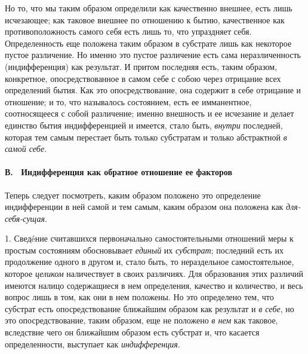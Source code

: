 Но то, что мы таким образом определили как качественно внешнее, есть лишь
исчезающее; как таковое внешнее по отношению к бытию, качественное как
противоположность самого себя есть лишь то, что упраздняет себя.
Определенность еще положена таким образом в субстрате лишь как некоторое
пустое различение. Но именно это пустое различение есть сама
неразличенность (индифференция) как результат. И притом последняя есть,
таким образом, конкретное, опосредствованное в самом себе с собою через
отрицание всех определений бытия. Как это опосредствование, она содержит в
себе отрицание и отношение; и то, что называлось состоянием, есть ее
имманентное, соотносящееся с собой различение; именно внешность и ее
исчезание и делает единство бытия индифференцией и имеется, стало быть,
{\em внутри} последней, которая тем самым перестает
быть только субстратам и только абстрактной {\em в самой себе}.

\paragraph[В. \ Индифференция как обратное отношение ее факторов (70)]{В.
\ Индифференция как обратное отношение ее факторов}
Теперь следует посмотреть, каким
образом положено это определение индифференции в ней самой и тем самым,
каким образом она положена как {\em для-себя-сущая}.

1. Сведéние считавшихся первоначально самостоятельными отношений меры к
простым состояниям обосновывает {\em единый} их
{\em субстрат}; последний есть их продолжение одного в
другом и, стало быть, то нераздельное самостоятельное, которое
{\em целиком} наличествует в своих различиях. Для
образования этих различий имеются налицо содержащиеся в нем определения,
качество и количество, и весь вопрос лишь в том, как они в нем положены. Но
это определено тем, что субстрат есть опосредствование ближайшим образом
как результат и {\em в себе}, но это опосредствование,
таким образом, еще не положено {\em в нем} как таковое,
вследствие чего он ближайшим образом есть субстрат и, что касается
определенности, выступает как {\em индифференция}.

